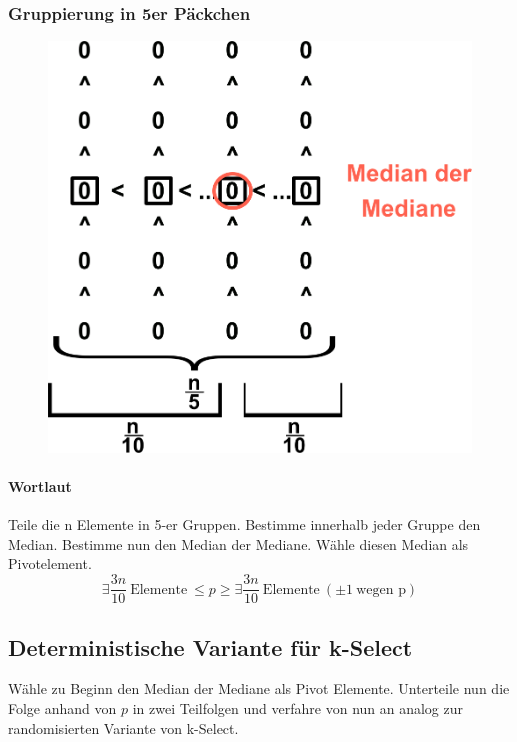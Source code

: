 \subsubsection*{Gruppierung in 5er Päckchen}
\begin{figure}
\vspace{-40pt}
\includegraphics[width=\linewidth]{08/Grafik/img1.png}
\caption{}
\end{figure}

\vspace{30pt}
\paragraph{Wortlaut}
Teile die n Elemente in 5-er Gruppen. Bestimme innerhalb jeder Gruppe den Median. Bestimme nun den Median der Mediane. Wähle diesen Median als Pivotelement.
\[\exists \frac{3n}{10}~\text{Elemente}~\leq p \geq \exists \frac{3n}{10}~\text{Elemente}~(\pm 1~\text{wegen p})\]
\vspace{50pt}


\newpage


\subsection{Deterministische Variante für k-Select}
Wähle zu Beginn den Median der Mediane als Pivot Elemente. Unterteile nun die Folge anhand von $p$ in zwei Teilfolgen und verfahre von nun an analog zur randomisierten Variante von k-Select.

